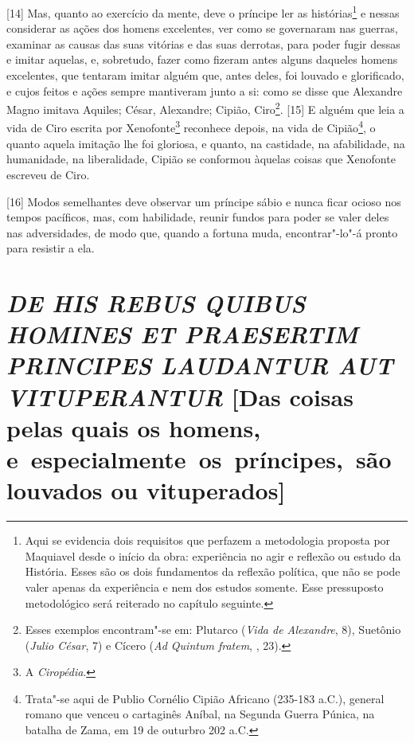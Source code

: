 {[}14{]} Mas, quanto ao exercício da mente, deve o príncipe ler as
histórias\footnote{Aqui se evidencia dois requisitos que perfazem a
  metodologia proposta por Maquiavel desde o início da obra: experiência
  no agir e reflexão ou estudo da História. Esses são os dois
  fundamentos da reflexão política, que não se pode valer apenas da
  experiência e nem dos estudos somente. Esse pressuposto metodológico
  será reiterado no capítulo seguinte.} e nessas considerar as ações dos
homens excelentes, ver como se governaram nas guerras, examinar as
causas das suas vitórias e das suas derrotas, para poder fugir dessas e
imitar aquelas, e, sobretudo, fazer como fizeram antes alguns daqueles
homens excelentes, que tentaram imitar alguém que, antes deles, foi
louvado e glorificado, e cujos feitos e ações sempre mantiveram junto a
si: como se disse que Alexandre Magno imitava Aquiles; César, Alexandre;
Cipião, Ciro\footnote{Esses exemplos encontram"-se em: Plutarco
  (\emph{Vida de Alexandre}, 8), Suetônio (\emph{Julio César}, 7) e
  Cícero (\emph{Ad Quintum fratem}, , 23).}. {[}15{]} E alguém que leia
a vida de Ciro escrita por Xenofonte\footnote{A \emph{Ciropédia}.}
reconhece depois, na vida de Cipião\footnote{Trata"-se aqui de Publio
  Cornélio Cipião Africano (235-183 a.C.), general romano que venceu o
  cartaginês Aníbal, na Segunda Guerra Púnica, na batalha de Zama, em 19
  de outurbro 202 a.C.}, o quanto aquela imitação lhe foi gloriosa, e
quanto, na castidade, na afabilidade, na humanidade, na liberalidade,
Cipião se conformou àquelas coisas que Xenofonte escreveu de Ciro.

{[}16{]} Modos semelhantes deve observar um príncipe sábio e nunca ficar
ocioso nos tempos pacíficos, mas, com habilidade, reunir fundos para
poder se valer deles nas adversidades, de modo que, quando a fortuna
muda, encontrar"-lo"-á pronto para resistir a ela.

\quebra\section{\emph{DE HIS REBUS QUIBUS HOMINES ET PRAESERTIM PRINCIPES LAUDANTUR AUT~
VITUPERANTUR}\break
{[}Das coisas pelas quais os homens, e~especialmente~os~príncipes,~são
louvados ou vituperados{]}}

